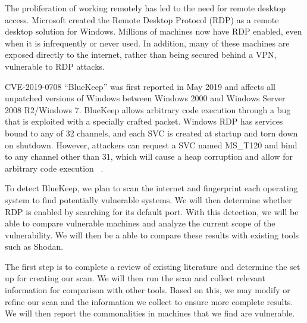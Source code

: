 The proliferation of working remotely has led to the need for remote desktop access. Microsoft created the Remote Desktop Protocol (RDP) as a remote desktop solution for Windows. Millions of machines now have RDP enabled, even when it is infrequently or never used. In addition, many of these machines are exposed directly to the internet, rather than being secured behind a VPN, vulnerable to RDP attacks.

CVE-2019-0708 ``BlueKeep'' was first reported in May 2019 and affects all unpatched versions of Windows between Windows 2000 and Windows Server 2008 R2/Windows 7. BlueKeep allows arbitrary code execution through a bug that is exploited with a specially crafted packet. Windows RDP has services bound to any of 32 channels, and each SVC is created at startup and torn down on shutdown. However, attackers can request a SVC named MS\_T120 and bind to any channel other than 31, which will cause a  heap corruption and allow for arbitrary code execution ~\cite{mcafee_rdp_blog}.

To detect BlueKeep, we plan to scan the internet and fingerprint each operating system to find potentially vulnerable systems. We will then determine whether RDP is enabled by searching for its default port. With this detection, we will be able to compare vulnerable machines and analyze the current scope of the vulnerability. We will then be a able to compare these results with existing tools such as Shodan.

The first step is to complete a review of existing literature and determine the set up for creating our scan. We will then run the scan and collect relevant information for comparison with other tools. Based on this, we may modify or refine our scan and the information we collect to ensure more complete results. We will then report the commonalities in machines that we find are vulnerable.